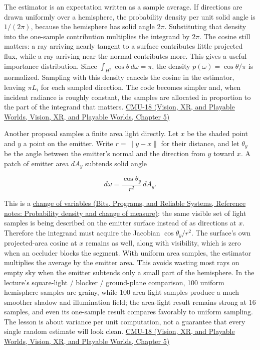 The estimator is an expectation written as a sample average. If directions are drawn uniformly over a hemisphere, the probability density per unit solid angle is \(1/(2\pi)\), because the hemisphere has solid angle \(2\pi\). Substituting that density into the one-sample contribution multiplies the integrand by \(2\pi\). The cosine still matters: a ray arriving nearly tangent to a surface contributes little projected flux, while a ray arriving near the normal contributes more. This gives a useful importance distribution. Since \(\int_{H^2}\cos\theta\,d\omega=\pi\), the density \(p(\omega)=\cos\theta/\pi\) is normalized. Sampling with this density cancels the cosine in the estimator, leaving \(\pi L_i\) for each sampled direction. The code becomes simpler and, when incident radiance is roughly constant, the samples are allocated in proportion to the part of the integrand that matters. \href{../07-Vision-XR-and-Playable-Worlds/main.pdf\#nameddest=04-visual-computing-ii-ch036-cmu-18---monte-carlo-rendering}{CMU-18 (Vision, XR, and Playable Worlds, Vision, XR, and Playable Worlds, Chapter 5)}

Another proposal samples a finite area light directly. Let \(x\) be the shaded point and \(y\) a point on the emitter. Write \(r=\|y-x\|\) for their distance, and let \(\theta_y\) be the angle between the emitter's normal and the direction from \(y\) toward \(x\). A patch of emitter area \(dA_y\) subtends solid angle

\[
d\omega = \frac{\cos\theta_y}{r^2}\,dA_y.
\]

This is a \href{../01-Bits-Programs-and-Reliable-Systems/main.pdf\#nameddest=appendix-4815cd87ab8b}{change of variables (Bits, Programs, and Reliable Systems, Reference notes: Probability density and change of measure)}: the same visible set of light samples is being described on the emitter surface instead of as directions at \(x\). Therefore the integrand must acquire the Jacobian \(\cos\theta_y/r^2\). The surface's own projected-area cosine at \(x\) remains as well, along with visibility, which is zero when an occluder blocks the segment. With uniform area samples, the estimator multiplies the average by the emitter area. This avoids wasting most rays on empty sky when the emitter subtends only a small part of the hemisphere. In the lecture's square-light / blocker / ground-plane comparison, 100 uniform hemisphere samples are grainy, while 100 area-light samples produce a much smoother shadow and illumination field; the area-light result remains strong at 16 samples, and even its one-sample result compares favorably to uniform sampling. The lesson is about variance per unit computation, not a guarantee that every single random estimate will look clean. \href{../07-Vision-XR-and-Playable-Worlds/main.pdf\#nameddest=04-visual-computing-ii-ch036-cmu-18---monte-carlo-rendering}{CMU-18 (Vision, XR, and Playable Worlds, Vision, XR, and Playable Worlds, Chapter 5)}

